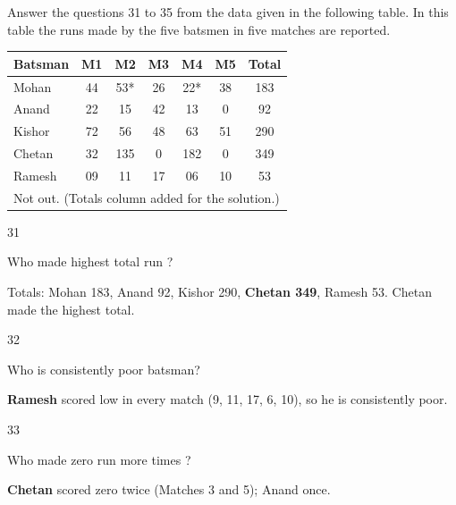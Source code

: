 \begin{context}
Answer the questions 31 to 35 from the data given in the following table. In this table the runs made by the five batsmen in five matches are reported.
\begin{center}\small
\begin{tabular}{lccccc|c}\toprule \textbf{Batsman} & M1 & M2 & M3 & M4 & M5 & \textbf{Total}\\\midrule
Mohan & 44 & 53* & 26 & 22* & 38 & 183\\ Anand & 22 & 15 & 42 & 13 & 0 & 92\\ Kishor & 72 & 56 & 48 & 63 & 51 & 290\\ Chetan & 32 & 135 & 0 & 182 & 0 & 349\\ Ramesh & 09 & 11 & 17 & 06 & 10 & 53\\\bottomrule
\multicolumn{7}{l}{\scriptsize * Not out. (Totals column added for the solution.)}
\end{tabular}
\end{center}
\end{context}
\begin{question}{31}
{Who made highest total run ?\par}
\begin{explain}
Totals: Mohan 183, Anand 92, Kishor 290, \textbf{Chetan 349}, Ramesh 53. Chetan made the highest total.
\end{explain}
\end{question}

\begin{question}{32}
{Who is consistently poor batsman?\par}
\begin{explain}
\textbf{Ramesh} scored low in every match (9, 11, 17, 6, 10), so he is consistently poor.
\end{explain}
\end{question}

\begin{question}{33}
{Who made zero run more times ?\par}
\begin{explain}
\textbf{Chetan} scored zero twice (Matches 3 and 5); Anand once.
\end{explain}
\end{question}

